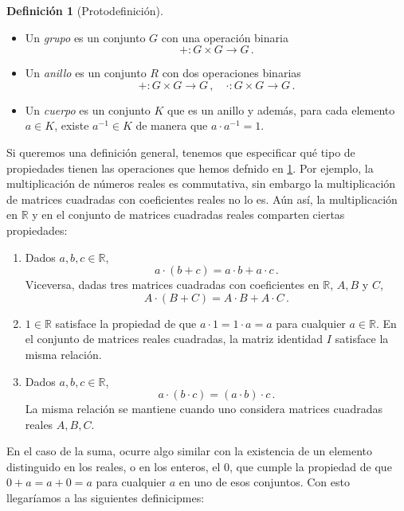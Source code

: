 \documentclass[a4paper,11pt]{amsart}
\theoremstyle{plain}
\theoremstyle{definition}
\newtheorem{defi}[thm]{Definición}
\theoremstyle{remark}
\begin{document}
\begin{defi}[Protodefinición]
\label{protodefinicion_1}
\begin{itemize}
    \item Un \textit{grupo} es un conjunto $G$ con una operación binaria 
    \[ + \colon G \times G \to G \, .\]
    \item Un \textit{anillo} es un conjunto $R$ con dos operaciones binarias
    \[ + \colon G \times G \to G \, ,\quad \cdot \colon G \times G \to G \, .\]
    \item Un \textit{cuerpo} es un conjunto $K$ que es un anillo y además, para cada elemento $a \in K$, existe $a^{-1} \in K$ de manera que $a \cdot a^{-1} = 1$.
\end{itemize}
\end{defi}

Si queremos una definición general, tenemos que especificar qué tipo de propiedades tienen las operaciones que hemos defnido en \ref{protodefinicion_1}. Por ejemplo, la multiplicación de números reales es commutativa, sin embargo la multiplicación de matrices cuadradas con coeficientes reales no lo es. Aún así, la multiplicación en $\mathbb{R}$ y en el conjunto de matrices cuadradas reales comparten ciertas propiedades: 
\begin{enumerate}[label = \arabic*)]
    \item Dados $a, b, c \in \mathbb{R}$, 
    \[ a \cdot (b + c) = a \cdot b + a \cdot c \, .\]
    Viceversa, dadas tres matrices cuadradas con coeficientes en $\mathbb{R}$, $A, B$ y $C$, 
    \[ A \cdot (B + C) = A \cdot B + A \cdot C \, .\]
    \item $1 \in \mathbb{R}$ satisface la propiedad de que $a \cdot 1 = 1 \cdot a = a$ para cualquier $a \in \mathbb{R}$. En el conjunto de matrices reales cuadradas, la matriz identidad $I$ satisface la misma relación. 
    \item Dados $a, b, c \in \mathbb{R}$, 
    \[ a \cdot (b \cdot c) = (a \cdot b) \cdot c \, .\]
    La misma relación se mantiene cuando uno considera matrices cuadradas reales $A, B, C$.
\end{enumerate}


En el caso de la suma, ocurre algo similar con la existencia de un elemento distinguido en los reales, o en los enteros, el $0$, que cumple la propiedad de que $0 + a = a + 0 = a$ para cualquier $a$ en uno de esos conjuntos. Con esto llegaríamos a las siguientes definicipmes: 
\end{document}
